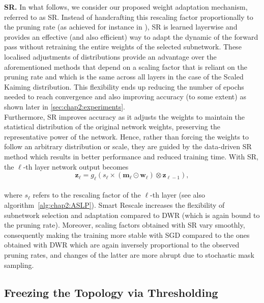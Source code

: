 \noindent\textbf{\acl{SR}.} In what follows, we consider our proposed weight
adaptation mechanism, referred to as \acf{SR}. Instead of handcrafting this
rescaling factor proportionally to the pruning rate (as achieved for instance in
\cite{DBLP:conf/nips/ZhouLLY19}), \ac{SR} is learned layerwise and provides an
effective (and also efficient) way to adapt the dynamic of the forward pass
without retraining the entire weights of the selected subnetwork. These
localised adjustments of distributions provide an advantage over the
aforementioned methods that depend on a scaling factor that is reliant on the
pruning rate and which is the same across all layers in the case of the Scaled
Kaiming distribution. This flexibility ends up reducing the number of epochs
needed to reach convergence and also improving accuracy (to some extent) as
shown later in \cref{sec:chap2:experiments}.\\

Furthermore, \ac{SR} improves accuracy as it adjusts the weights to maintain the
statistical distribution of the original network weights, preserving the
representative power of the network. Hence, rather than forcing the weights to
follow an arbitrary distribution or scale, they are guided by the data-driven
\ac{SR} method which results in better performance and reduced training time.
With \ac{SR}, the $\ell$-th layer network output becomes \\

\begin{equation}
  \mathbf{z}_{\ell} = g_\ell(s_\ell \times (\bm{m}_\ell \odot \bm{w}_\ell) \otimes \mathbf{z}_{\ell-1}),
\end{equation}\\

\noindent where $s_\ell$ refers to the rescaling factor  of the $\ell$-th layer
(see also algorithm~\ref{alg:chap2:ASLP}). Smart Rescale increases the
flexibility of subnetwork selection and adaptation compared to \ac{DWR} (which
is again bound to the pruning rate). Moreover, scaling factors obtained with
\ac{SR} vary smoothly, consequently making the training more stable with
\ac{SGD} compared to the ones obtained with \ac{DWR} which are again inversely
proportional to the observed pruning rates, and changes of the latter are more
abrupt due to stochastic mask sampling. \\


\subsection{Freezing the Topology via Thresholding}
\label{sec:chap2:freezing_topology}

